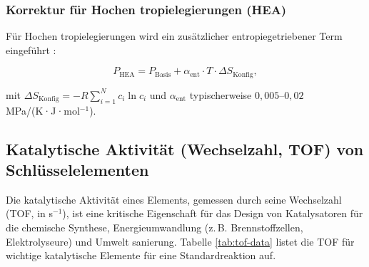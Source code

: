 \documentclass[12pt,a4paper]{article}
\begin{document}
\subsubsection{Korrektur für Hochen tropielegierungen (HEA)}

Für Hochen tropielegierungen wird ein zusätzlicher entropiegetriebener Term eingeführt \cite{Wen2019, Yang2012}:

\begin{equation}
	P_{\text{HEA}} = P_{\text{Basis}} + \alpha_{\text{ent}} \cdot T \cdot \Delta S_{\text{Konfig}},
	\label{eq:hea}
\end{equation}

mit \(\Delta S_{\text{Konfig}} = -R \sum_{i=1}^{N} c_i \ln c_i\) und \(\alpha_{\text{ent}}\) typischerweise \(0,005\)–\(0,02\) MPa/(K·J·mol\(^{-1}\)).

\subsection{Katalytische Aktivität (Wechselzahl, TOF) von Schlüsselelementen}
\label{subsec:catalytic-activity}

Die katalytische Aktivität eines Elements, gemessen durch seine Wechselzahl (TOF, in s\(^{-1}\)), ist eine kritische Eigenschaft für das Design von Katalysatoren für die chemische Synthese, Energieumwandlung (z. B. Brennstoffzellen, Elektrolyseure) und Umwelt sanierung. Tabelle \ref{tab:tof-data} listet die TOF für wichtige katalytische Elemente für eine Standardreaktion auf.
\end{document}

